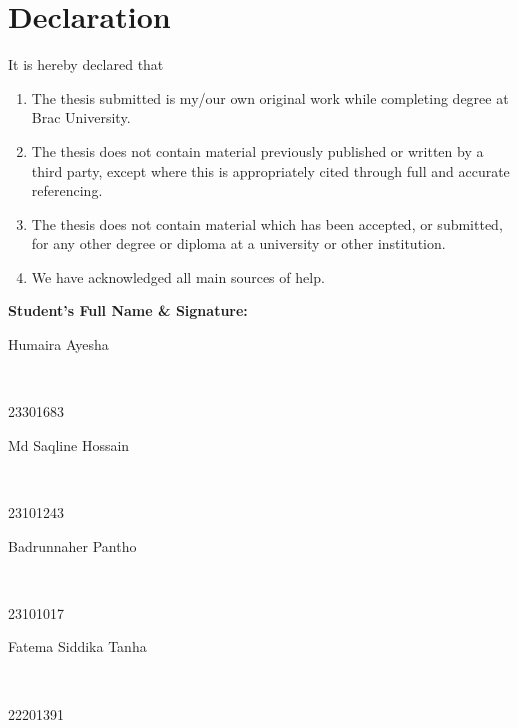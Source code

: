 \newcommand*\wildcard[2][6cm]{\vspace{2cm}\parbox{#1}{\hrulefill\par#2}} 


\section*{Declaration}

It is hereby declared that

\begin{enumerate} %
  \item The thesis submitted is my/our own original work while completing degree at Brac University.
  \item The thesis does not contain material previously published or written by a third party, except where this is appropriately cited through full and accurate referencing.
  \item The thesis does not contain material which has been accepted, or submitted, for any other degree or diploma at a university or other institution.
  \item We have acknowledged all main sources of help.
\end{enumerate}

\vspace{1cm}
\textbf{Student’s Full Name \& Signature:} %

\begingroup

    \begin{center}
        \wildcard{\centerline{Humaira Ayesha} ~\\ \centerline{23301683}} %
        \hspace{2cm} %
        \wildcard{\centerline{Md Saqline Hossain} ~\\ \centerline{23101243} }
        \wildcard{\centerline{Badrunnaher Pantho} ~\\ \centerline{23101017} }
        \hspace{2cm}
        \wildcard{\centerline{Fatema Siddika Tanha} ~\\ \centerline{22201391} }
    \end{center}

\endgroup


\pagebreak





